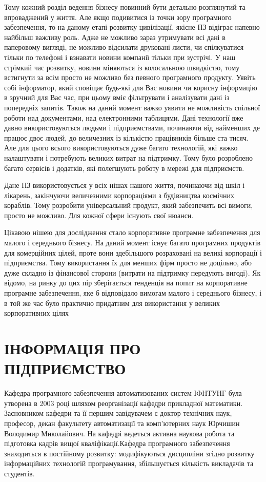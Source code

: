 Тому кожний розділ ведення бізнесу повинний бути детально розглянутий та впроваджений у життя. 
Але якщо подивитися із точки зору програмного забезпечення, то на даному етапі розвитку цивілізації, якісне ПЗ відіграє напевно найбільш важливу роль. 
Адже не можливо зараз утримувати всі дані в паперовому вигляді, не можливо відсилати друковані листи, чи спілкуватися тільки по телефоні і взнавати новини компанії тільки при зустрічі. 
У наш стрімкий час розвитку, новини міняються із колосальною швидкістю, тому встигнути за всім просто не можливо без певного програмного продукту. 
Уявіть собі інформатор, який сповіщає будь-які для Вас новини чи корисну інформацію в зручний для Вас час, при цьому вміє фільтрувати і аналізувати дані із попередніх запитів. 
Також на даний момент важко уявити не можливість спільної роботи над документами, над електронними таблицями. 
Дані технології вже давно використовуються людьми і підприємствами, починаючи від найменших де працює двоє людей, до величезних із кількістю працівників більше ста тисяч. 
Але для цього всього використовуються дуже багато технологій, які важко налаштувати і потребують великих витрат на підтримку.
Тому було розроблено багато сервісів і додатків, які полегшують роботу в мережі для підприємств.
\par Дане ПЗ використовується у всіх нішах нашого життя, починаючи від шкіл і лікарень, закінчуючи величезними корпораціями з будівництва космічних кораблів. 
Тому розробити універсальний продукт, який забезпечить всі вимоги, просто не можливо. 
Для кожної сфери існують свої нюанси.
\par Цікавою нішею для дослідження стало корпоративне програмне забезпечення для малого і середнього бізнесу.
 На даний момент існує багато програмних продуктів для комерційних цілей, проте вони здебільшого розраховані на великі корпорації і підприємства.
Тому використання їх для менших фірм просто не доцільно, або дуже складно із фінансової сторони (витрати на підтримку передують вигоді).
Як відомо, на ринку до цих пір зберігається тенденція на попит на корпоративне програмне забезпечення, яке б відповідало вимогам малого і середнього бізнесу, і в той же час було практично придатним для використання у великих корпоративних цілях

\section{ІНФОРМАЦІЯ ПРО ПІДПРИЄМСТВО}
Кафедра програмного забезпечення автоматизованих систем ІФНТУНГ була утворена в 2003 році шляхом реорганізації кафедри прикладної математики.
Засновником кафедри та її першим завідувачем є доктор технічних наук, професор, декан факультету автоматизації та комп'ютерних наук Юрчишин Володимир Миколайович.
На кафедрі ведеться активна наукова робота та підготовка кадрів вищої кваліфікації.Кафедра програмного забезпечення знаходиться в постійному розвитку: модифікуються дисципліни згідно розвитку інформаційних технологій програмування, збільшується кількість викладачів та студентів.


